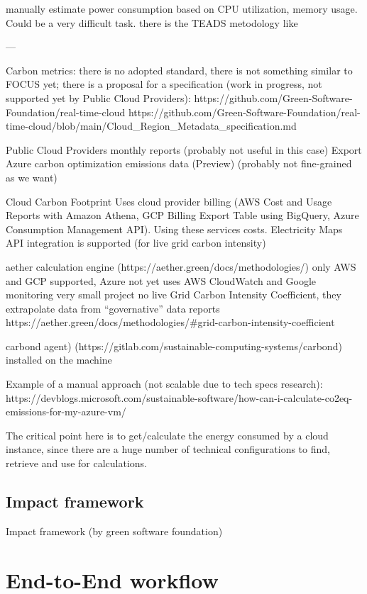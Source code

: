 manually estimate power consumption based on CPU utilization, memory usage. Could be a very difficult task. 
there is the TEADS metodology like 



---


Carbon metrics:
there is no adopted standard, there is not something similar to FOCUS yet;
there is a proposal for a specification (work in progress, not supported yet by Public Cloud Providers): 
https://github.com/Green-Software-Foundation/real-time-cloud 
https://github.com/Green-Software-Foundation/real-time-cloud/blob/main/Cloud_Region_Metadata_specification.md 


Public Cloud Providers monthly reports (probably not useful in this case)
Export Azure carbon optimization emissions data (Preview) (probably not fine-grained as we want)

Cloud Carbon Footprint
Uses cloud provider billing (AWS Cost and Usage Reports with Amazon Athena, GCP Billing Export Table using BigQuery, Azure Consumption 
Management API). Using these services costs.
Electricity Maps API integration is supported (for live grid carbon intensity)

 
aether calculation engine (https://aether.green/docs/methodologies/) 
only AWS and GCP supported, Azure not yet
uses AWS CloudWatch and Google monitoring
very small project
no live Grid Carbon Intensity Coefficient, they extrapolate data from “governative” data reports
https://aether.green/docs/methodologies/#grid-carbon-intensity-coefficient


carbond agent) (https://gitlab.com/sustainable-computing-systems/carbond)
installed on the machine


Example of a manual approach (not scalable due to tech specs research): https://devblogs.microsoft.com/sustainable-software/how-can-i-calculate-co2eq-emissions-for-my-azure-vm/ 

The critical point here is to get/calculate the energy consumed by a cloud instance, since there are a huge number of technical configurations to find, retrieve and use for calculations.



\subsection{Impact framework}

Impact framework (by green software foundation)

\section{End-to-End workflow}
\label{sec:e2eflow}

